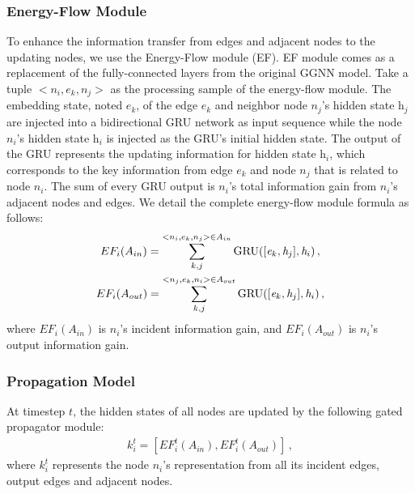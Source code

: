 \documentclass[letterpaper]{article} %
\begin{document}
\subsubsection{Energy-Flow Module}
To enhance the information transfer from edges and adjacent nodes to the updating nodes, we use the Energy-Flow module (EF).
EF module comes as a replacement of the fully-connected layers from the original GGNN model. 
Take a tuple $<{n}_i, {e}_k, {n}_j>$ as the processing sample of the energy-flow module. 
The embedding state, noted $\textit{e}_k$, of the edge ${e}_k$ and neighbor node ${n}_j$'s hidden state $\textit{h}_j$ are injected into a bidirectional GRU network as input sequence while the node ${n}_i$'s hidden state $\textit{h}_i$ is injected as the GRU's initial hidden state. 
The output of the GRU represents the updating information for hidden state $\textit{h}_i$, which corresponds to the key information from edge ${e}_k$ and node ${n}_j$ that is related to node ${n}_i$. 
The sum of every GRU output is ${n}_i$'s total information gain from ${n}_i$'s adjacent nodes and edges. 
We detail the complete energy-flow module formula as follows:
\begin{gather}\notag
    EF_i(A_{in}) = \sum\limits_{k,j}^{<n_i,e_k,n_j>\in A_{in}} \text{GRU}([\textit{e}_k, \textit{h}_j], \textit{h}_i) \, , \\ \notag
    EF_i(A_{out}) = \sum\limits_{k,j}^{<{n}_j,{e}_k,{n}_i>\in A_{out}} \text{GRU}([\textit{e}_k, \textit{h}_j], \textit{h}_i) \, ,\notag
\end{gather}
where $EF_i(A_{in})$ is ${n}_i$'s incident information gain, and $EF_i(A_{out})$ is ${n}_i$'s output information gain.


\subsubsection{Propagation Model}

At timestep $t$, the hidden states of all nodes are updated by the following gated propagator module:
\begin{gather}
    k_{i}^t = [EF_i^t(A_{in}), EF_i^t(A_{out})] \, ,
\end{gather}
where $k_{i}^t$ represents the node ${n}_i$'s representation from all its incident edges, output edges and adjacent nodes.
\end{document}
